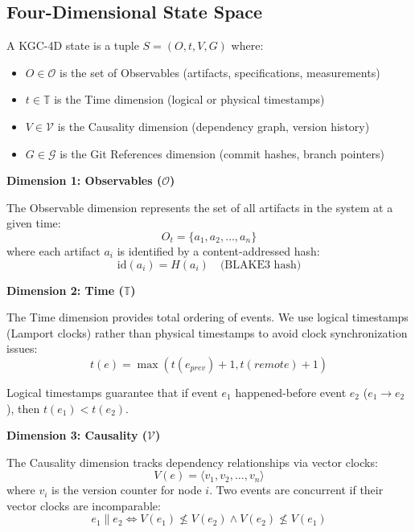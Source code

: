 \subsection{Four-Dimensional State Space}

\begin{definition}
    A KGC-4D state is a tuple \(S = (O, t, V, G)\) where:
    \begin{itemize}
        \item \(O \in \mathcal{O}\) is the set of Observables (artifacts, specifications, measurements)
        \item \(t \in \mathbb{T}\) is the Time dimension (logical or physical timestamps)
        \item \(V \in \mathcal{V}\) is the Causality dimension (dependency graph, version history)
        \item \(G \in \mathcal{G}\) is the Git References dimension (commit hashes, branch pointers)
    \end{itemize}
\end{definition}

\textbf{Dimension 1: Observables (\(\mathcal{O}\))}

The Observable dimension represents the set of all artifacts in the system at a given time:
\begin{equation}
    O_t = \{a_1, a_2, \ldots, a_n\}
\end{equation}
where each artifact \(a_i\) is identified by a content-addressed hash:
\begin{equation}
    \text{id}(a_i) = H(a_i) \quad \text{(BLAKE3 hash)}
\end{equation}

\textbf{Dimension 2: Time (\(\mathbb{T}\))}

The Time dimension provides total ordering of events. We use logical timestamps (Lamport clocks) rather than physical timestamps to avoid clock synchronization issues:
\begin{equation}
    t(e) = \max(t(e_{prev}) + 1, t(remote) + 1)
\end{equation}

Logical timestamps guarantee that if event \(e_1\) happened-before event \(e_2\) (\(e_1 \rightarrow e_2\)), then \(t(e_1) < t(e_2)\).

\textbf{Dimension 3: Causality (\(\mathcal{V}\))}

The Causality dimension tracks dependency relationships via vector clocks:
\begin{equation}
    V(e) = \langle v_1, v_2, \ldots, v_n \rangle
\end{equation}
where \(v_i\) is the version counter for node \(i\). Two events are concurrent if their vector clocks are incomparable:
\begin{equation}
    e_1 \parallel e_2 \iff V(e_1) \nleq V(e_2) \land V(e_2) \nleq V(e_1)
\end{equation}

